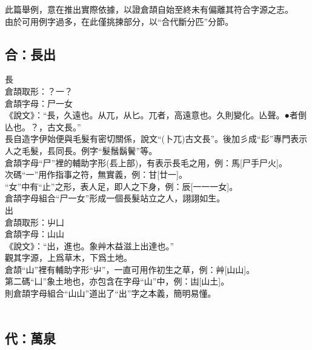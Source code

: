 \documentclass{article}
\begin{document}
此篇舉例，意在推出實際依據，以證倉頡自始至終未有偏離其符合字源之志。\\
由於可用例字過多，在此僅挑揀部分，以“合代斷分匹”分節。\\

\subsection{合：長出}

長\\
倉頡取形：？一？\\
倉頡字母：尸一女\\
《說文》：“長，久遠也。从兀，从匕。兀者，高遠意也。久則變化。亾聲。●者倒亾也。？，古文長。”\\
長自造字伊始便與毛髮有密切關係，說文“(卜兀)古文長”。後加彡成“髟”專門表示人之毛髮，镸同長。例字“髮鬚鬍鬢”等。\\
倉頡字母“尸”裡的輔助字形(镸上部)，有表示長毛之用，例：馬[尸手尸火]。\\
次碼“一”用作指事之符，無實義，例：甘[廿一]。\\
“女”中有“止”之形，表人足，即人之下身，例：辰[一一一女]。\\
倉頡字母組合“尸一女”形成一個長髮站立之人，詡詡如生。\\

出\\
倉頡取形：屮凵\\
倉頡字母：山山\\
《說文》：“出，進也。象艸木益滋上出達也。”\\
觀其字源，上爲草木，下爲土地。\\
倉頡“山”裡有輔助字形“屮”，一直可用作初生之草，例：艸[山山]。\\
第二碼“凵”象土地也，亦包含在字母“山”中，例：凷[山土]。\\
則倉頡字母組合“山山”道出了“出”字之本義，簡明易懂。\\
\\
\subsection{代：萬泉}
\end{document}
